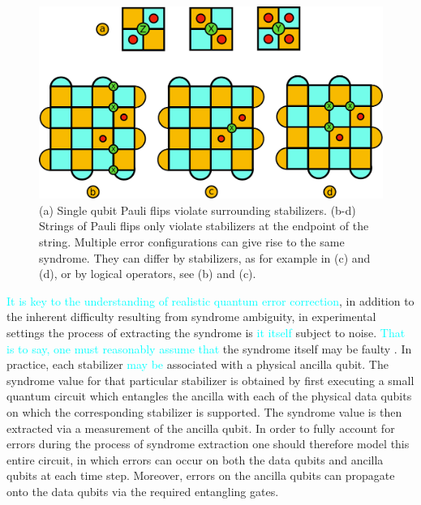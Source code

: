 \documentclass[twocolumn,preprintnumbers,amsmath,amssymb,notitlepage,nofootinbib,longbibliography,superscriptaddress,aps,pra,10pt]{revtex4-1}
\newcommand{\je}[1]{\textcolor{cyan}{#1}}
\begin{document}
	\begin{figure}
	\centering
	\includegraphics[width=1\linewidth]{figures/surface_code_examples.pdf}
	\caption{
		(a) Single qubit Pauli flips violate surrounding stabilizers.
		(b-d) Strings of Pauli flips only violate stabilizers at the endpoint of the string.
		Multiple error configurations can give rise to the same syndrome.
		They can differ by stabilizers, as for example in (c) and (d), or by logical operators, see (b) and (c).}
		\label{f:surface_code_examples}
	\end{figure}
	
	
	\je{It is key to the understanding of realistic quantum error correction}, 	
	in addition to the inherent difficulty resulting from syndrome ambiguity, in experimental settings the process of extracting the syndrome is %
	\je{it itself} subject to noise. \je{That is to say, one must reasonably assume that}
	the syndrome itself may be faulty \cite{tomita2014low,stephens2014fault}.
	In practice, each stabilizer %
	\je{may be} 
	associated with a physical ancilla qubit.
	The syndrome value for that particular stabilizer is obtained by first executing a small quantum circuit which entangles the ancilla with each of the physical data qubits on which the corresponding stabilizer is supported.
	The syndrome value is then extracted via a measurement of the ancilla qubit.
	In order to fully account for errors during the process of syndrome extraction one should therefore model this entire circuit, in which errors can occur on both the data qubits and ancilla qubits at each time step.
	Moreover, errors on the ancilla qubits can propagate onto the data qubits via the required entangling gates.
\end{document}
